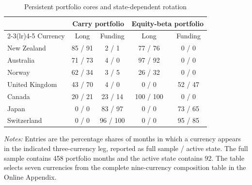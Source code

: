 \begin{table}[H]
\centering
\caption{Persistent portfolio cores and state-dependent rotation}
\label{tab:v03-portfolio-composition}
\small
\begin{tabular}{lcccc}
\toprule
& \multicolumn{2}{c}{Carry portfolio} & \multicolumn{2}{c}{Equity-beta portfolio} \\
\cmidrule(lr){2-3}\cmidrule(lr){4-5}
Currency & Long & Funding & Long & Funding \\
\midrule
New Zealand & 85 / 91 & 2 / 1 & 77 / 76 & 0 / 0 \\
Australia   & 71 / 73 & 4 / 0 & 97 / 92 & 0 / 0 \\
Norway      & 62 / 34 & 3 / 5 & 26 / 32 & 0 / 0 \\
United Kingdom & 43 / 70 & 4 / 0 & 0 / 0 & 52 / 47 \\
Canada      & 20 / 21 & 23 / 14 & 100 / 100 & 0 / 0 \\
Japan       & 0 / 0 & 83 / 97 & 0 / 0 & 73 / 65 \\
Switzerland & 0 / 0 & 96 / 100 & 0 / 0 & 95 / 85 \\
\bottomrule
\end{tabular}

\begin{minipage}{0.91\textwidth}
\footnotesize\emph{Notes:} Entries are the percentage shares of months in which a currency appears in the indicated three-currency leg, reported as full sample / active state. The full sample contains 458 portfolio months and the active state contains 92. The table selects seven currencies from the complete nine-currency composition table in the Online Appendix.
\end{minipage}
\end{table}
